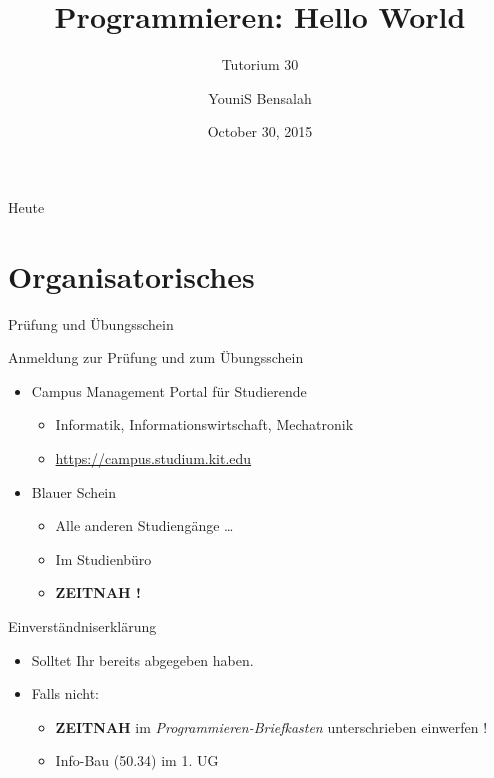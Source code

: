 \documentclass[18pt]{beamer}
\title[Hello World]{Programmieren: Hello World}
\subtitle{Tutorium 30}
\author{YouniS Bensalah}
\date{October 30, 2015}
\institute{Chair for Software Design and Quality}
\begin{document}

\begin{frame}
\titlepage
\end{frame}

\begin{frame}{Heute}
\tableofcontents
\end{frame}

\section{Organisatorisches}

\begin{frame}{Prüfung und Übungsschein}
    \begin{block}{Anmeldung zur Prüfung und zum Übungsschein}
        \begin{itemize}
            \item Campus Management Portal für Studierende
            \begin{itemize}
                \item Informatik, Informationswirtschaft, Mechatronik
                \item \url{https://campus.studium.kit.edu}
            \end{itemize}
            \pause

            \item Blauer Schein
            \begin{itemize}
                \item Alle anderen Studiengänge \dots
                \item Im Studienbüro
                \pause
                \item \textbf{ZEITNAH !}
            \end{itemize}
        \end{itemize}
    \end{block}
\end{frame}

\begin{frame}{Einverständniserklärung}
    \begin{itemize}
        \item Solltet Ihr bereits abgegeben haben.
        \pause
        \item Falls nicht:
        \begin{itemize}
            \item \textbf{ZEITNAH} im \textit{Programmieren-Briefkasten} unterschrieben einwerfen !
            \item Info-Bau (50.34) im 1. UG
        \end{itemize}
    \end{itemize}
\end{frame}
\end{document}
